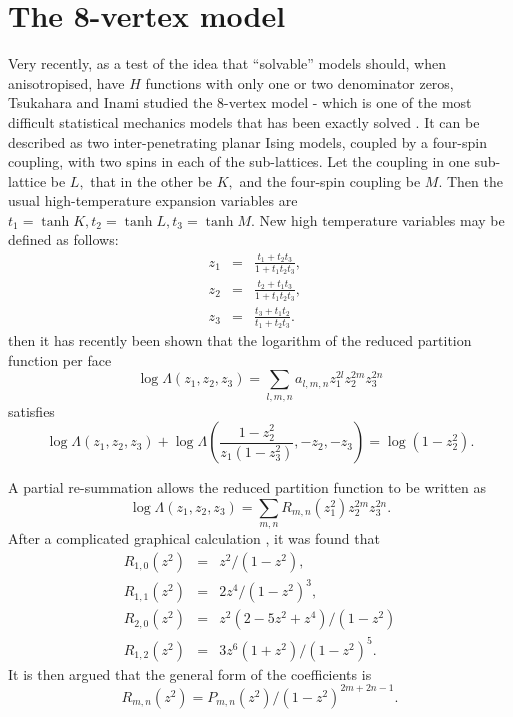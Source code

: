 \section{The 8-vertex model}
Very recently, as a test of the idea that ``solvable'' models should,
when anisotropised, have $H$ functions with only one or two
denominator zeros, Tsukahara and Inami \cite{TI98} studied the 8-vertex
model - which is one of the most difficult statistical mechanics  models
that has been exactly solved \cite{Bax80}. It can be described
as two  inter-penetrating planar Ising models,
coupled by a four-spin coupling, with two spins in each of
the sub-lattices. Let the coupling in one sub-lattice be $L,$
that in the other be $K,$ and the four-spin coupling be $M.$
Then the usual high-temperature expansion
variables are $t_1=\tanh{K}, t_2=\tanh{L}, t_3=\tanh{M}.$
New high temperature variables may be defined as follows:
\begin{eqnarray}
z_1 &=& \frac{t_1 + t_2t_3}{1 + t_1t_2t_3}, \mbox{  }\\
z_2 &=& \frac{t_2 + t_1t_3}{1 + t_1t_2t_3}, \mbox{  }\\
z_3 &=& \frac{t_3 + t_1t_2}{t_1 + t_2t_3}.
\end{eqnarray}
then it has recently been shown \cite{TI98} that the logarithm of the reduced
partition function per face $$\log{ \Lambda(z_1,z_2,z_3)} = \sum_{l,m,n}
a_{l,m,n} z_1^{2l}z_2^{2m}z_3^{2n}$$ satisfies
\begin{equation}
\log{ \Lambda(z_1,z_2,z_3)} + \log{ \Lambda(\frac{1-z_2^2}{z_1(1-z_3^2)},-z_2,-z_3)} = \log(1 - z_2^2).
\end{equation}

A partial re-summation allows the reduced partition function
to be written as
\begin{equation}
\log\Lambda(z_1,z_2,z_3) =  \sum_{m,n} R_{m,n}(z_1^2)z_2^{2m}z_3^{2n}. 
 \end{equation}
After a complicated graphical calculation \cite{TI98}, 
it was found that
\begin{eqnarray}
R_{1,0}(z^2)& =& z^2/(1 - z^2), \\
R_{1,1}(z^2)& =& 2z^4/(1 - z^2)^3, \\ 
R_{2,0}(z^2)& =& z^2(2 - 5z^2 + z^4)/(1 - z^2) \\
R_{1,2}(z^2)& =& 3z^6(1 + z^2)/(1 - z^2)^5.
    \end{eqnarray}
It is then argued \cite{TI98} that the general form of the
coefficients is
$$R_{m,n}(z^2) = P_{m,n}(z^2)/(1 - z^2)^{2m+2n-1}.$$

